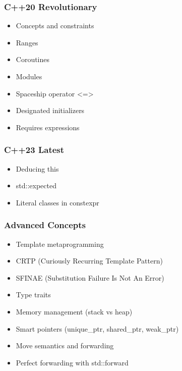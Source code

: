 \hypertarget{c20-revolutionary}{%
\subsubsection{C++20 Revolutionary}\label{c20-revolutionary}}

\begin{itemize}
\tightlist
\item
  Concepts and constraints
\item
  Ranges
\item
  Coroutines
\item
  Modules
\item
  Spaceship operator \textless=\textgreater{}
\item
  Designated initializers
\item
  Requires expressions
\end{itemize}

\hypertarget{c23-latest}{%
\subsubsection{C++23 Latest}\label{c23-latest}}

\begin{itemize}
\tightlist
\item
  Deducing this
\item
  std::expected
\item
  Literal classes in constexpr
\end{itemize}

\hypertarget{advanced-concepts}{%
\subsubsection{Advanced Concepts}\label{advanced-concepts}}

\begin{itemize}
\tightlist
\item
  Template metaprogramming
\item
  CRTP (Curiously Recurring Template Pattern)
\item
  SFINAE (Substitution Failure Is Not An Error)
\item
  Type traits
\item
  Memory management (stack vs heap)
\item
  Smart pointers (unique\_ptr, shared\_ptr, weak\_ptr)
\item
  Move semantics and forwarding
\item
  Perfect forwarding with std::forward
\end{itemize}

